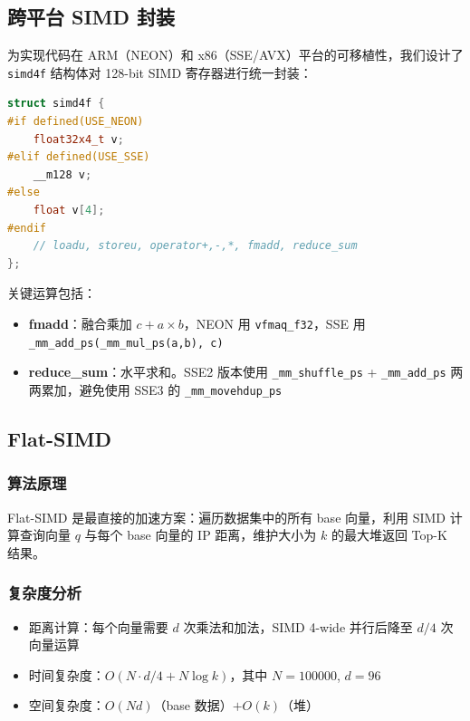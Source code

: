 \documentclass[a4paper]{article}
\begin{document}
\subsection{跨平台 SIMD 封装}

为实现代码在 ARM（NEON）和 x86（SSE/AVX）平台的可移植性，我们设计了 \texttt{simd4f} 结构体对 128-bit SIMD 寄存器进行统一封装：

\begin{lstlisting}[language=C++, title=simd4f 结构体定义]
struct simd4f {
#if defined(USE_NEON)
    float32x4_t v;
#elif defined(USE_SSE)
    __m128 v;
#else
    float v[4];
#endif
    // loadu, storeu, operator+,-,*, fmadd, reduce_sum
};
\end{lstlisting}

关键运算包括：
\begin{itemize}
  \item \textbf{fmadd}：融合乘加 $c + a \times b$，NEON 用 \texttt{vfmaq\_f32}，SSE 用 \texttt{\_mm\_add\_ps(\_mm\_mul\_ps(a,b), c)}
  \item \textbf{reduce\_sum}：水平求和。SSE2 版本使用 \texttt{\_mm\_shuffle\_ps} + \texttt{\_mm\_add\_ps} 两两累加，避免使用 SSE3 的 \texttt{\_mm\_movehdup\_ps}
\end{itemize}

\subsection{Flat-SIMD}

\subsubsection{算法原理}

Flat-SIMD 是最直接的加速方案：遍历数据集中的所有 base 向量，利用 SIMD 计算查询向量 $q$ 与每个 base 向量的 IP 距离，维护大小为 $k$ 的最大堆返回 Top-K 结果。

\subsubsection{复杂度分析}

\begin{itemize}
  \item 距离计算：每个向量需要 $d$ 次乘法和加法，SIMD 4-wide 并行后降至 $d/4$ 次向量运算
  \item 时间复杂度：$O(N \cdot d/4 + N \log k)$，其中 $N=100000$, $d=96$
  \item 空间复杂度：$O(Nd)$（base 数据）$+ O(k)$（堆）
\end{itemize}
\end{document}
